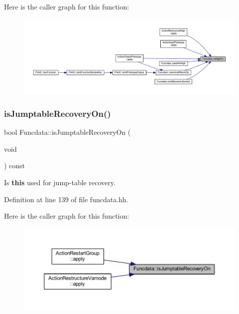 Here is the caller graph for this function\+:
\nopagebreak
\begin{figure}[H]
\begin{center}
\leavevmode
\includegraphics[width=350pt]{class_funcdata_a624dc32b7a1a0563bae734de63378139_icgraph}
\end{center}
\end{figure}
\mbox{\label{class_funcdata_a0f4f50447bca9f83a2a8923ff78f9983}} 
\subsubsection{\texorpdfstring{isJumptableRecoveryOn()}{isJumptableRecoveryOn()}}
{\footnotesize\ttfamily bool Funcdata\+::is\+Jumptable\+Recovery\+On (\begin{DoxyParamCaption}\item[{void}]{ }\end{DoxyParamCaption}) const\hspace{0.3cm}{\ttfamily [inline]}}



Is {\bfseries{this}} used for jump-\/table recovery. 



Definition at line 139 of file funcdata.\+hh.

Here is the caller graph for this function\+:
\nopagebreak
\begin{figure}[H]
\begin{center}
\leavevmode
\includegraphics[width=350pt]{class_funcdata_a0f4f50447bca9f83a2a8923ff78f9983_icgraph}
\end{center}
\end{figure}
\mbox{\label{class_funcdata_ac67b670f722fcb5aa113746f972ab1b7}} 
